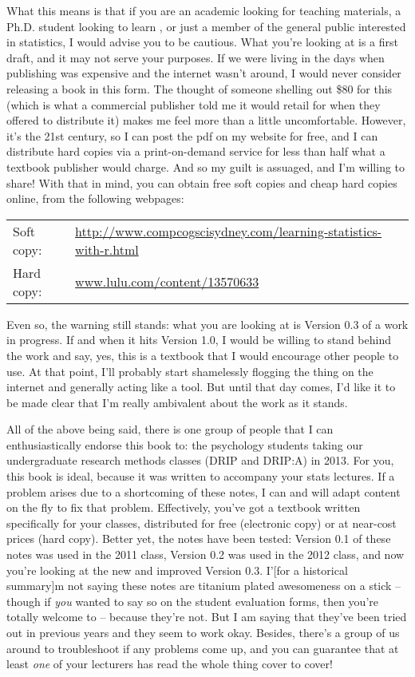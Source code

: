 What this means is that if you are an academic looking for teaching materials, a Ph.D. student looking to learn \R, or just a member of the general public interested in statistics, I would advise you to be cautious. What you're looking at is a first draft, and it may not serve your purposes. If we were living in the days when publishing was expensive and the internet wasn't around, I would never consider releasing a book in this form. The thought of someone shelling out \$80 for this (which is what a commercial publisher told me it would retail for when they offered to distribute it) makes me feel more than a little uncomfortable. However, it's the 21st century, so I can post the pdf on my website for free, and I can distribute hard copies via a print-on-demand service for less than half what a textbook publisher would charge. And so my guilt is assuaged, and I'm willing to share! With that in mind, you can obtain free soft copies and cheap hard copies online, from the following webpages:\vsp

\noindent
\begin{tabular}{ll}
Soft copy: &\url{http://www.compcogscisydney.com/learning-statistics-with-r.html}\\
Hard copy: & \url{www.lulu.com/content/13570633} 
\end{tabular}
\vsp

Even so, the warning still stands: what you are looking at is Version 0.3 of a work in progress. If and when it hits Version 1.0, I would be willing to stand behind the work and say, yes, this is a textbook that I would encourage other people to use. At that point, I'll probably start shamelessly flogging the thing on the internet and generally acting like a tool. But until that day comes, I'd like it to be made clear that I'm really ambivalent about the work as it stands. \vsp

All of the above being said, there is one group of people that I can enthusiastically endorse this book to: the psychology students taking our undergraduate research methods classes (DRIP and DRIP:A) in 2013. For you, this book is ideal, because it was written to accompany your stats lectures. If a problem arises due to a shortcoming of these notes, I can and will adapt content on the fly to fix that problem. Effectively, you've got a textbook written specifically for your classes, distributed for free (electronic copy) or at near-cost prices (hard copy). Better yet, the notes have been tested: Version 0.1 of these notes was used in the 2011 class, Version 0.2 was used in the 2012 class, and now you're looking at the new and improved Version 0.3. I'[for a historical summary]m not saying these notes are titanium plated awesomeness on a stick -- though if {\it you} wanted to say so on the student evaluation forms, then you're totally welcome to -- because they're not. But I am saying that they've been tried out in previous years and they seem to work okay. Besides, there's a group of us around to troubleshoot if any problems come up, and you can guarantee that at least {\it one} of your lecturers has read the whole thing cover to cover! \vsp

